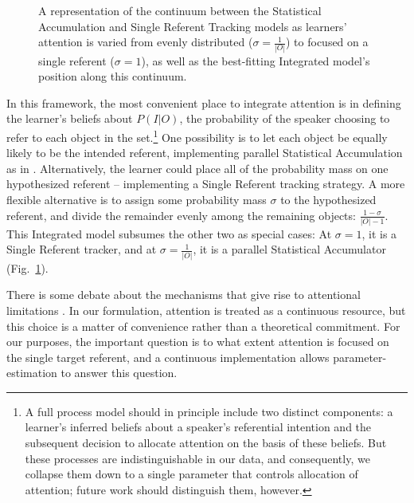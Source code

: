 \documentclass[authoryear,review]{elsarticle}
\begin{document}
 \begin{figure}[tb]
	\caption{\label{fig:models} A representation of the continuum between the Statistical Accumulation and Single Referent Tracking models as learners' attention is varied from evenly distributed ($\sigma=\frac{1}{|O|}$) to focused on a single referent ($\sigma=1$), as well as the best-fitting Integrated model's position along this continuum.}
\end{figure}

In this framework, the most convenient place to integrate attention is in defining the learner's beliefs about $P(I|O)$, the probability of the speaker choosing to refer to each object in the set.\footnote{A full process model should in principle include two distinct components: a learner's inferred beliefs about a speaker's referential intention and the subsequent decision to allocate attention on the basis of these beliefs. But these processes are indistinguishable in our data, and consequently, we collapse them down to a single parameter that controls allocation of attention; future work should distinguish them, however.} One possibility is to let each object be equally likely to be the intended referent, implementing parallel Statistical Accumulation as in \citet{Frank2009a}. Alternatively, the learner could place all of the probability mass on one hypothesized referent -- implementing a Single Referent tracking strategy. A more flexible alternative is to assign some probability mass $\sigma$ to the hypothesized referent, and divide the remainder evenly among the remaining objects: $\frac{1-\sigma}{|O|-1}$. This Integrated model subsumes the other two as special cases: At $\sigma=1$, it is a Single Referent tracker, and at $\sigma=\frac{1}{|O|}$, it is a parallel Statistical Accumulator (Fig.~\ref{fig:models}).

There is some debate about the mechanisms that give rise to attentional limitations \citep[e.g.][]{Wei2012}. In our formulation, attention is treated as a continuous resource, but this choice is a matter of convenience rather than a theoretical commitment. For our purposes, the important question is to what extent attention is focused on the single target referent, and a continuous implementation allows parameter-estimation to answer this question.
\end{document}
